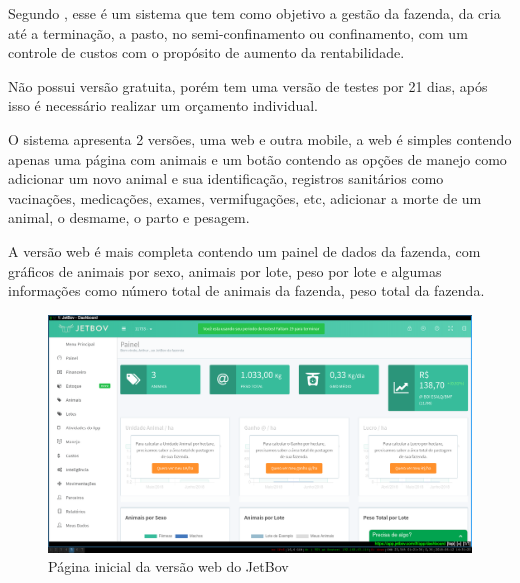 \documentclass[12pt]{article}
\begin{document}
\begin{titlepage}
Segundo , esse é um sistema que tem como objetivo a gestão da fazenda, da cria até a terminação, a pasto, no semi-confinamento ou confinamento, com um controle de custos com o propósito de aumento da rentabilidade. 

Não possui versão gratuita, porém tem uma versão de testes por 21 dias, após isso é necessário realizar um orçamento individual.

O sistema apresenta 2 versões, uma web e outra mobile, a web é simples contendo apenas uma página com animais e um botão contendo as opções de manejo como adicionar um novo animal e sua identificação, registros sanitários como vacinações, medicações, exames, vermifugações, etc, adicionar a morte de um animal, o desmame, o parto e pesagem.

A versão web é mais completa contendo um painel de dados da fazenda, com gráficos de animais por sexo, animais por lote, peso por lote e algumas informações como número total de animais da fazenda, peso total da fazenda. 

\begin{figure}[!h]
\begin{center}
\caption{Página inicial da versão web do JetBov}
\includegraphics[width=6in]{img/jetbov.png}

\end{center}
\end{figure}


\end{titlepage}
\end{document}
